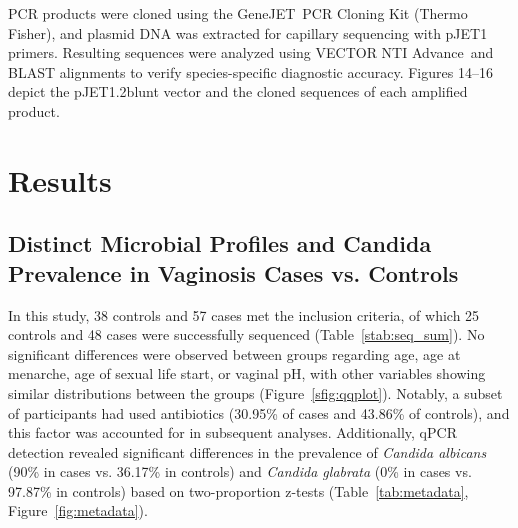 \documentclass[biotech,article,submit,pdftex,moreauthors]{Definitions/mdpi}
\begin{document}
PCR products were cloned using the GeneJET\texttrademark~PCR Cloning Kit (Thermo Fisher), and plasmid DNA was extracted for capillary sequencing with pJET1 primers. Resulting sequences were analyzed using VECTOR NTI Advance\texttrademark~and BLAST alignments to verify species-specific diagnostic accuracy. Figures 14--16 depict the pJET1.2blunt vector and the cloned sequences of each amplified product.




\section{Results}

\subsection{Distinct Microbial Profiles and Candida Prevalence in Vaginosis Cases vs. Controls}

In this study, 38 controls and 57 cases met the inclusion criteria, of which 25 controls and 48 cases were successfully sequenced (Table~\ref{stab:seq_sum}). No significant differences were observed between groups regarding age, age at menarche, age of sexual life start, or vaginal pH, with other variables showing similar distributions between the groups (Figure~\ref{sfig:qqplot}). Notably, a subset of participants had used antibiotics (30.95\% of cases and 43.86\% of controls), and this factor was accounted for in subsequent analyses. Additionally, qPCR detection revealed significant differences in the prevalence of \textit{Candida albicans} (90\% in cases vs. 36.17\% in controls) and \textit{Candida glabrata} (0\% in cases vs. 97.87\% in controls) based on two-proportion z-tests (Table~\ref{tab:metadata}, Figure~\ref{fig:metadata}).
\end{document}
